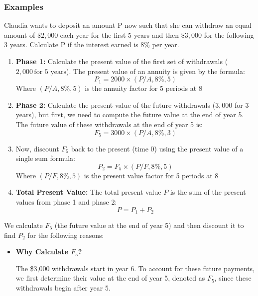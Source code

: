 \subsubsection{Examples}
    \begin{example}
        Claudia wants to deposit an amount P now such that she can withdraw an equal amount of $\$2,000$ each year for the first 5 years and then $\$3,000$ for the following 3 years. Calculate P if the interest earned is 8\% per year. 
        \begin{enumerate}
            \item \textbf{Phase 1:} Calculate the present value of the first set of withdrawals ($2,000 \, \text{for 5 years}$). 
            The present value of an annuity is given by the formula:
            \[
            P_1 = 2000 \times (P/A, 8\%, 5)
            \]
            Where $(P/A, 8\%, 5)$ is the annuity factor for 5 periods at 8%
        
            \item \textbf{Phase 2:} Calculate the present value of the future withdrawals ($3,000$ for 3 years), but first, we need to compute the future value at the end of year 5.
            The future value of these withdrawals at the end of year 5 is:
            \[
            F_5 = 3000 \times (P/A, 8\%, 3)
            \]
            
            \item Now, discount \( F_5 \) back to the present (time 0) using the present value of a single sum formula:
            \[
            P_2 = F_5 \times (P/F, 8\%, 5)
            \]
            Where $(P/F, 8\%, 5)$ is the present value factor for 5 periods at 8%
        
            \item \textbf{Total Present Value:} The total present value \( P \) is the sum of the present values from phase 1 and phase 2:
            \[
            P = P_1 + P_2
            \]
        \end{enumerate}

        We calculate $F_5$ (the future value at the end of year 5) and then discount it to find $P_2$ for the following reasons:

        \begin{itemize}
            \item \textbf{Why Calculate $F_5$?} 
            
            The \$3,000 withdrawals start in year 6. To account for these future payments, we first determine their value at the end of year 5, denoted as $F_5$, since these withdrawals begin after year 5.
            

\end{itemize}
\end{example}
